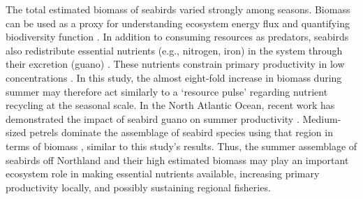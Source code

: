 \documentclass[preprint, 3p, authoryear]{elsarticle} %
\begin{document}
The total estimated biomass of seabirds varied strongly among seasons. Biomass can be used as a proxy for understanding ecosystem energy flux and quantifying biodiversity function \citep{barnes2018, jochum2021, kokubun2025}. In addition to consuming resources as predators, seabirds also redistribute essential nutrients (e.g., nitrogen, iron) in the system through their excretion (guano) \citep{wing2014, doughty2016, steibl2024}. These nutrients constrain primary productivity in low concentrations \citep{boyd2004, moore2013}. In this study, the almost eight-fold increase in biomass during summer may therefore act similarly to a `resource pulse' \citep[e.g.,][]{yang2008} regarding nutrient recycling at the seasonal scale. In the North Atlantic Ocean, recent work has demonstrated the impact of seabird guano on summer productivity \citep{browning2023}. Medium-sized petrels dominate the assemblage of seabird species using that region in terms of biomass \citep{wakefield2021}, similar to this study's results. Thus, the summer assemblage of seabirds off Northland and their high estimated biomass may play an important ecosystem role in making essential nutrients available, increasing primary productivity locally, and possibly sustaining regional fisheries.
\end{document}
